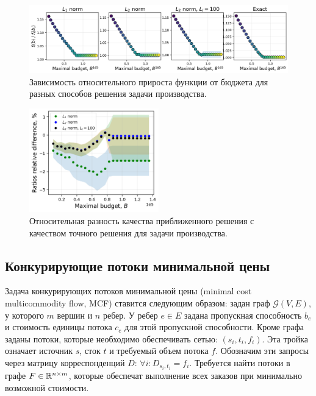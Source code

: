 \begin{figure}
\centering
\includegraphics[width=\textwidth]{figures/simplest/relations.png}
            \caption{ Зависимость относительного прироста функции от бюджета для разных способов решения задачи производства.}
    \label{fig:simple:results}
\end{figure}
    
\begin{figure}
    \centering
    \includegraphics[width=0.5\textwidth]{figures/simplest/relative_difference.png}
    \caption{ Относительная разность качества приближенного решения с качеством точного решения для задачи производства.}
    \label{fig:simple:relations}
\end{figure}

\subsection{Конкурирующие потоки минимальной цены}\label{exp:concurrent}
Задача конкурирующих потоков минимальной цены (minimal cost multicommodity flow, MCF) ставится следующим образом: задан граф $\mathcal{G}(V, E)$, у которого $m$ вершин и $n$ ребер. У ребер $e \in E$  задана пропускная способность $b_e$ и стоимость единицы потока $c_e$ для этой пропускной способности.  Кроме графа заданы потоки, которые необходимо обеспечивать сетью: $(s_i, t_i, f_i)$. Эта тройка означает источник $s$, сток $t$ и требуемый объем потока $f$. Обозначим эти запросы через матрицу корреспонденций $D$: $\forall i: D_{s_i, t_i} = f_i$. Требуется найти потоки в графе  $F \in{\mathbb R}^{n\times m}$, которые обеспечат выполнение всех заказов при минимально возможной стоимости.

